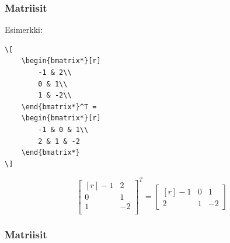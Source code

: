 \begin{frame}[fragile]
    \frametitle{Matriisit}

    Esimerkki:\vaihto
    \begin{minipage}{5cm}
        \begin{scriptsize}
            \begin{Verbatim}[frame=single]
\[
    \begin{bmatrix*}[r]
        -1 & 2\\
        0 & 1\\
        1 & -2\\
    \end{bmatrix*}^T = 
    \begin{bmatrix*}[r]
        -1 & 0 & 1\\
        2 & 1 & -2
    \end{bmatrix*}
\]
            \end{Verbatim}
        \end{scriptsize}
    \end{minipage}
    \begin{minipage}{5cm}
        \[
        \begin{bmatrix*}[r]
            -1 & 2\\
            0 & 1\\
            1 & -2\\
        \end{bmatrix*}^T = 
        \begin{bmatrix*}[r]
            -1 & 0 & 1\\
            2 & 1 & -2
        \end{bmatrix*}
        \]
    \end{minipage}
\end{frame}
\begin{frame}[fragile]
    \frametitle{Matriisit}
    
\end{frame}
